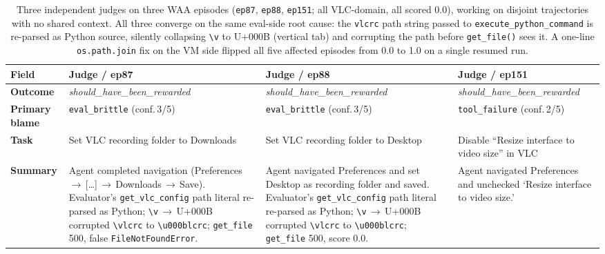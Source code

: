 \documentclass{article}
\begin{document}
\begin{table}[t]
\centering
\caption{%
  Three independent judges on three WAA episodes
  (\texttt{ep87}, \texttt{ep88}, \texttt{ep151}; all VLC-domain, all scored 0.0),
  working on disjoint trajectories with no shared context.
  All three converge on the same eval-side root cause: the \texttt{vlcrc}
  path string passed to \texttt{execute\_python\_command} is re-parsed as
  Python source, silently collapsing \texttt{\textbackslash{}v} to
  U+000B (vertical tab) and corrupting the path before \texttt{get\_file()}
  sees it.  A one-line \texttt{os.path.join} fix on the VM side flipped
  all five affected episodes from 0.0 to 1.0 on a single resumed run.
}
\label{tab:judge-case-vlc-vlcrc}
\scriptsize
\setlength{\tabcolsep}{4pt}
\renewcommand{\arraystretch}{1.4}
\begin{tabularx}{\linewidth}{@{} >{\bfseries\RaggedRight}p{2.0cm}
                                  >{\RaggedRight\arraybackslash}X
                                  >{\RaggedRight\arraybackslash}X
                                  >{\RaggedRight\arraybackslash}X @{}}
\toprule
Field & Judge / ep87 & Judge / ep88 & Judge / ep151 \\
\midrule
\rowcolor{rowgray}
Outcome
  & \emph{should\_have\_been\_rewarded}
  & \emph{should\_have\_been\_rewarded}
  & \emph{should\_have\_been\_rewarded} \\
Primary blame
  & \texttt{eval\_brittle} (conf.\,3/5)
  & \texttt{eval\_brittle} (conf.\,3/5)
  & \texttt{tool\_failure} (conf.\,2/5) \\
\rowcolor{rowgray}
Task
  & Set VLC recording folder to Downloads
  & Set VLC recording folder to Desktop
  & Disable ``Resize interface to video size'' in VLC \\
Summary
  & Agent completed navigation (Preferences\,$\to$\,[\ldots]\,$\to$\,Downloads\,$\to$\,Save).
    Evaluator's \texttt{get\_vlc\_config} path literal re-parsed as Python;
    \texttt{\textbackslash v}\,$\to$\,U+000B corrupted \texttt{\textbackslash vlcrc}
    to \texttt{\textbackslash u000blcrc}; \texttt{get\_file} 500, false \texttt{FileNotFoundError}.
  & Agent navigated Preferences and set Desktop as recording folder and saved.
    Evaluator's \texttt{get\_vlc\_config} path literal re-parsed as Python;
    \texttt{\textbackslash v}\,$\to$\,U+000B corrupted \texttt{\textbackslash vlcrc}
    to \texttt{\textbackslash u000blcrc}; \texttt{get\_file} 500, score 0.0.
  & Agent navigated Preferences and unchecked `Resize interface to video size.'

\end{tabularx}
\end{table}
\end{document}
